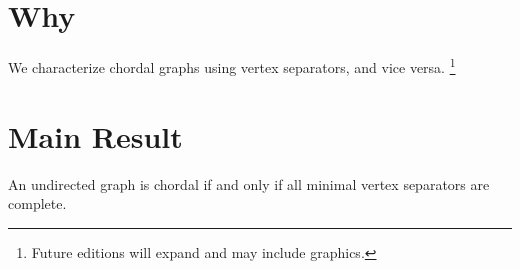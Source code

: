 
\section*{Why}

We characterize chordal graphs using vertex separators, and vice versa.
  \ifhmode\unskip\fi\footnote{
Future editions will expand and may include graphics.
  }

\section*{Main Result}

\begin{proposition}An undirected graph is chordal if and only if all minimal vertex separators are complete.\end{proposition}
